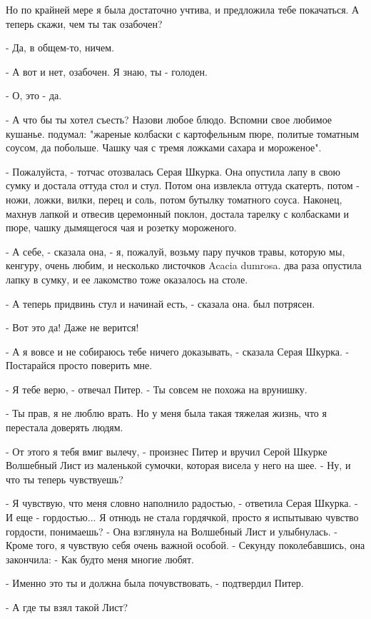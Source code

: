 Но по крайней мере я была достаточно учтива, и предложила тебе 
покачаться. А теперь скажи, чем ты так озабочен?
\par- Да, в общем-то, ничем.
\par- А вот и нет, озабочен. Я знаю, ты - голоден.
\par- О, это - да.
\par- А что бы ты хотел съесть? Назови любое блюдо. Вспомни свое 
любимое кушанье.
 подумал: "жареные колбаски с картофельным пюре, политые 
томатным соусом, да побольше. Чашку чая с тремя ложками сахара и 
мороженое".
\par- Пожалуйста, - тотчас отозвалась Серая Шкурка. Она опустила лапу 
в свою сумку и достала оттуда стол и стул. Потом она извлекла оттуда 
скатерть, потом - ножи, ложки, вилки, перец и соль, потом бутылку 
томатного соуса. Наконец, махнув лапкой и отвесив церемонный поклон, 
достала тарелку с колбасками и пюре, чашку дымящегося чая и розетку 
мороженого.
\par- А себе, - сказала она, - я, пожалуй, возьму пару пучков травы, 
которую мы, кенгуру, очень любим, и несколько листочков Acacia 
dumrosa.
 два раза опустила лапку в сумку, и ее лакомство тоже оказалось 
на столе.
\par- А теперь придвинь стул и начинай есть, - сказала она.
 был потрясен.
\par- Вот это да! Даже не верится!
\par- А я вовсе и не собираюсь тебе ничего доказывать, - сказала Серая 
Шкурка. - Постарайся просто поверить мне.
\par- Я тебе верю, - отвечал Питер. - Ты совсем не похожа на врунишку.
\par- Ты прав, я не люблю врать. Но у меня была такая тяжелая жизнь, 
что я перестала доверять людям.
\par- От этого я тебя вмиг вылечу, - произнес Питер и вручил Серой 
Шкурке Волшебный Лист из маленькой сумочки, которая висела у него на 
шее. - Ну, и что ты теперь чувствуешь?
\par- Я чувствую, что меня словно наполнило радостью, - ответила Серая 
Шкурка. - И еще - гордостью... Я отнюдь не стала гордячкой, просто я 
испытываю чувство гордости, понимаешь? - Она взглянула на Волшебный 
Лист и улыбнулась. - Кроме того, я чувствую себя очень важной особой. 
- Секунду поколебавшись, она закончила: - Как будто меня многие любят.
\par- Именно это ты и должна была почувствовать, - подтвердил Питер.
\par- А где ты взял такой Лист?
